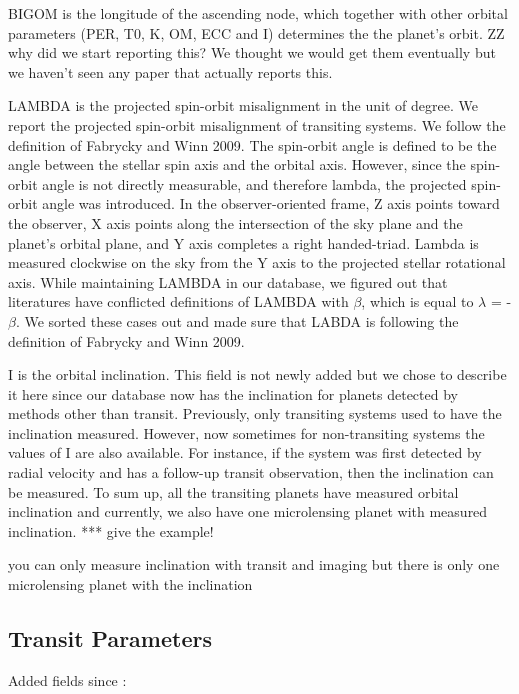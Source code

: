 \documentclass[11pt,preprint]{aastex}
\begin{document}
\begin{CJK*}{UTF8}{gbsn}
BIGOM is the longitude of the ascending node, which together with other orbital parameters (PER, T0, K, OM, ECC and I) determines the the planet's orbit. 
ZZ why did we start reporting this?
We thought we would get them eventually but we haven't seen any paper that actually reports this.

LAMBDA is the projected spin-orbit misalignment in the unit of degree. We report the projected spin-orbit misalignment of transiting systems. We follow the definition of Fabrycky and Winn 2009. The spin-orbit angle is defined to be the angle between the stellar spin axis and the orbital axis. However, since the spin-orbit angle is not directly measurable, and therefore lambda, the projected spin-orbit angle was introduced. In the observer-oriented frame, Z axis points toward the observer, X axis points along the intersection of the sky plane and the planet's orbital plane, and Y axis completes a right handed-triad. Lambda is measured clockwise on the sky from the Y axis to the projected stellar rotational axis. While maintaining LAMBDA in our database, we figured out that literatures have conflicted definitions of LAMBDA with $\beta$, which is equal to $\lambda$ = -$\beta$. We sorted these cases out and made sure that LABDA is following the definition of Fabrycky and Winn 2009. 


I is the orbital inclination. This field is not newly added but we chose to describe it here since our database now has the inclination for planets detected by methods other than transit. Previously, only transiting systems used to have the inclination measured. However, now sometimes for
non-transiting systems the values of I are also available. For instance, if the system was first detected by radial velocity and has a follow-up transit observation, then the inclination can be measured. To sum up, all the transiting planets have measured orbital inclination and currently, we also have one microlensing planet with measured inclination. *** give the example!

you can only measure inclination with transit and imaging but there is only one microlensing planet with the inclination


\subsection{Transit Parameters}

Added fields since \cite{Wright2011}:


\end{CJK*}
\end{document}
